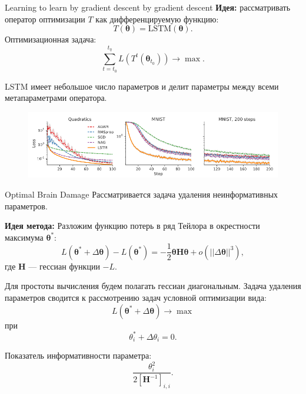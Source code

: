 \documentclass[10pt,pdf,utf8,russian,aspectratio=169]{beamer}
\begin{document}
\begin{frame}{Learning to learn by gradient descent by gradient descent}
\textbf{Идея: } рассматривать оператор оптимизации $T$ как дифференцируемую функцию:
\[
    T(\boldsymbol{\theta}) = \text{LSTM}(\boldsymbol{\theta}).
\]
Оптимизационная задача:
\[
    \sum_{t=t_0}^{t_\eta} L\left(T^t(\boldsymbol{\theta}_{t_0})\right) \to \max.
\]

LSTM имеет небольшое число параметров и делит параметры между всеми метапараметрами оператора.

\begin{figure}
\includegraphics[width=\textwidth]{sgd_by_sgd.png}
\end{figure}
\end{frame}


\begin{frame}{Optimal Brain Damage}
Рассматривается задача удаления неинформативных параметров.

\textbf{Идея метода:}
Разложим функцию потерь в ряд Тейлора в окрестности максимума $\boldsymbol{\theta}^{*}:$
\[
    L(\boldsymbol{\theta}^{*} + \Delta \boldsymbol{\theta}) -  L(\boldsymbol{\theta}^{*} ) = -\frac{1}{2} \boldsymbol{\theta} \mathbf{H} \boldsymbol{\theta}  + o(||\Delta \boldsymbol{\theta}||^3),
\]
где $\mathbf{H}$ --- гессиан функции $-L$.

Для простоты вычисления будем полагать гессиан диагональным. Задача удаления параметров сводится к рассмотрению задач условной оптимизации вида:
\[
    L(\boldsymbol{\theta}^{*} + \Delta \boldsymbol{\theta}) \to \max 
\]
при 
\[
    {\theta}^{*}_i + \Delta \theta_i = 0.
\]

Показатель информативности параметра: 
\[
    \frac{\theta_{i}^2}{2[\mathbf{H}^{-1}]_{i,i}}.
\]

\end{frame}
\end{document}
